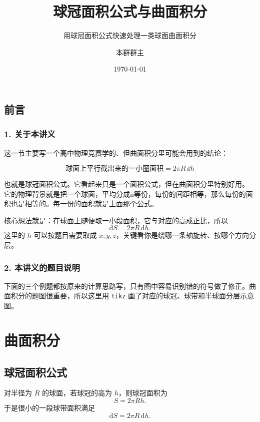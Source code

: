 \documentclass[lang=cn,newtx,10pt,scheme=chinese]{elegantbook}
\title{球冠面积公式与曲面积分} %
\subtitle{用球冠面积公式快速处理一类球面曲面积分}
\author{本群群主}
\institute{本群}
\date{\today}
\begin{document}
\maketitle
\frontmatter

\newpage

\section*{前言}

\subsection*{\textbf{1. 关于本讲义}}
这一节主要写一个高中物理竞赛学的、但曲面积分里可能会用到的结论：

\[
\boxed{\text{球面上平行截出来的一小圈面积}=2\pi R\,\dd h}
\]

也就是球冠面积公式。它看起来只是一个面积公式，但在曲面积分里特别好用。
它的物理背景就是把一个球面，平均分成n等份，每份的间距相等，那么每份的面积也是相等的。每一份的面积就是上面那个公式。


核心想法就是：在球面上随便取一小段面积，它与对应的高成正比，所以
\[
\mathrm{d}S=2\pi R\,\mathrm{d}h.
\]
这里的 $h$ 可以按题目需要取成 $x,y,z$，关键看你是绕哪一条轴旋转、按哪个方向分层。

\subsection*{\textbf{2. 本讲义的题目说明}}
下面的三个例题都按原来的计算思路写，只有图中容易识别错的符号做了修正。曲面积分的题图很重要，所以这里用 \verb|tikz| 画了对应的球冠、球带和半球面分层示意图。

\newpage

\tableofcontents
\mainmatter

\chapter{曲面积分}

\section{球冠面积公式}

\begin{theorem}[球冠面积公式]
对半径为 $R$ 的球面，若球冠的高为 $h$，则球冠面积为
\[
S=2\pi Rh.
\]
于是很小的一段球带面积满足
\[
\mathrm{d}S=2\pi R\,\mathrm{d}h.
\]
\end{theorem}
\end{document}
